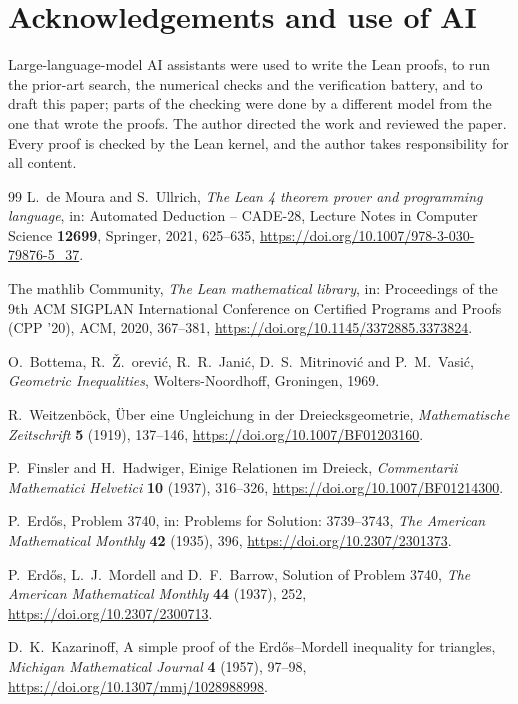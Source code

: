 \documentclass[11pt]{article}
\theoremstyle{definition}
\theoremstyle{remark}
\begin{document}
\section*{Acknowledgements and use of AI}
Large-language-model AI assistants were used to write the Lean proofs, to run the prior-art search,
the numerical checks and the verification battery, and to draft this paper; parts of the checking were
done by a different model from the one that wrote the proofs. The author directed the work and
reviewed the paper. Every proof is checked by the Lean kernel, and the author takes responsibility for
all content.
\begin{thebibliography}{99}
L.~de Moura and S.~Ullrich,
\emph{The Lean 4 theorem prover and programming language},
in: Automated Deduction -- CADE-28, Lecture Notes in Computer Science \textbf{12699}, Springer, 2021, 625--635,
\url{https://doi.org/10.1007/978-3-030-79876-5_37}.

The mathlib Community,
\emph{The Lean mathematical library},
in: Proceedings of the 9th ACM SIGPLAN International Conference on Certified Programs and Proofs (CPP '20), ACM, 2020, 367--381,
\url{https://doi.org/10.1145/3372885.3373824}.

O.~Bottema, R.~\v{Z}.~\DJ{}or\dj{}evi\'c, R.~R.~Jani\'c, D.~S.~Mitrinovi\'c and P.~M.~Vasi\'c,
\emph{Geometric Inequalities}, Wolters-Noordhoff, Groningen, 1969.

R.~Weitzenb\"ock, \"Uber eine Ungleichung in der Dreiecksgeometrie, \emph{Mathematische Zeitschrift}
\textbf{5} (1919), 137--146, \url{https://doi.org/10.1007/BF01203160}.

P.~Finsler and H.~Hadwiger, Einige Relationen im Dreieck, \emph{Commentarii Mathematici Helvetici}
\textbf{10} (1937), 316--326, \url{https://doi.org/10.1007/BF01214300}.

P.~Erd\H{o}s, Problem 3740, in: Problems for Solution: 3739--3743, \emph{The American Mathematical
Monthly} \textbf{42} (1935), 396, \url{https://doi.org/10.2307/2301373}.

P.~Erd\H{o}s, L.~J.~Mordell and D.~F.~Barrow, Solution of Problem 3740, \emph{The American
Mathematical Monthly} \textbf{44} (1937), 252, \url{https://doi.org/10.2307/2300713}.

D.~K.~Kazarinoff, A simple proof of the Erd\H{o}s--Mordell inequality for triangles,
\emph{Michigan Mathematical Journal} \textbf{4} (1957), 97--98,
\url{https://doi.org/10.1307/mmj/1028988998}.


\end{thebibliography}
\end{document}
